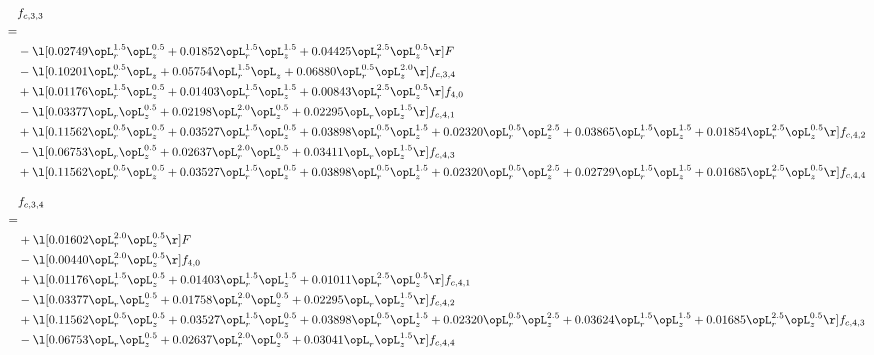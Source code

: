 \begin{alignat}{2} 
\label{eq:f_33_2} 
& f_{c,3,3} \nonumber \\ 
 = \\ 
& - \l[  0.02749 \opL_r^{1.5} \opL_z^{0.5} +  0.01852 \opL_r^{1.5} \opL_z^{1.5} +  0.04425 \opL_r^{2.5} \opL_z^{0.5}  \r] F \nonumber \\ 
& - \l[  0.10201 \opL_r^{0.5} \opL_z +  0.05754 \opL_r^{1.5} \opL_z +  0.06880 \opL_r^{0.5} \opL_z^{2.0}  \r] f_{c,3,4} \nonumber \\ 
& + \l[  0.01176 \opL_r^{1.5} \opL_z^{0.5} +  0.01403 \opL_r^{1.5} \opL_z^{1.5} +  0.00843 \opL_r^{2.5} \opL_z^{0.5}  \r] f_{4,0} \nonumber \\ 
& - \l[  0.03377 \opL_r \opL_z^{0.5} +  0.02198 \opL_r^{2.0} \opL_z^{0.5} +  0.02295 \opL_r \opL_z^{1.5}  \r] f_{c,4,1} \nonumber \\ 
& + \l[  0.11562 \opL_r^{0.5} \opL_z^{0.5} +  0.03527 \opL_r^{1.5} \opL_z^{0.5} +  0.03898 \opL_r^{0.5} \opL_z^{1.5} +  0.02320 \opL_r^{0.5} \opL_z^{2.5} +  0.03865 \opL_r^{1.5} \opL_z^{1.5} +  0.01854 \opL_r^{2.5} \opL_z^{0.5}  \r] f_{c,4,2} \nonumber \\ 
& - \l[  0.06753 \opL_r \opL_z^{0.5} +  0.02637 \opL_r^{2.0} \opL_z^{0.5} +  0.03411 \opL_r \opL_z^{1.5}  \r] f_{c,4,3} \nonumber \\ 
& + \l[  0.11562 \opL_r^{0.5} \opL_z^{0.5} +  0.03527 \opL_r^{1.5} \opL_z^{0.5} +  0.03898 \opL_r^{0.5} \opL_z^{1.5} +  0.02320 \opL_r^{0.5} \opL_z^{2.5} +  0.02729 \opL_r^{1.5} \opL_z^{1.5} +  0.01685 \opL_r^{2.5} \opL_z^{0.5}  \r] f_{c,4,4} \nonumber \\ 
\end{alignat} 


\begin{alignat}{2} 
\label{eq:f_34_2} 
& f_{c,3,4} \nonumber \\ 
 = \\ 
& + \l[  0.01602 \opL_r^{2.0} \opL_z^{0.5}  \r] F \nonumber \\ 
& - \l[  0.00440 \opL_r^{2.0} \opL_z^{0.5}  \r] f_{4,0} \nonumber \\ 
& + \l[  0.01176 \opL_r^{1.5} \opL_z^{0.5} +  0.01403 \opL_r^{1.5} \opL_z^{1.5} +  0.01011 \opL_r^{2.5} \opL_z^{0.5}  \r] f_{c,4,1} \nonumber \\ 
& - \l[  0.03377 \opL_r \opL_z^{0.5} +  0.01758 \opL_r^{2.0} \opL_z^{0.5} +  0.02295 \opL_r \opL_z^{1.5}  \r] f_{c,4,2} \nonumber \\ 
& + \l[  0.11562 \opL_r^{0.5} \opL_z^{0.5} +  0.03527 \opL_r^{1.5} \opL_z^{0.5} +  0.03898 \opL_r^{0.5} \opL_z^{1.5} +  0.02320 \opL_r^{0.5} \opL_z^{2.5} +  0.03624 \opL_r^{1.5} \opL_z^{1.5} +  0.01685 \opL_r^{2.5} \opL_z^{0.5}  \r] f_{c,4,3} \nonumber \\ 
& - \l[  0.06753 \opL_r \opL_z^{0.5} +  0.02637 \opL_r^{2.0} \opL_z^{0.5} +  0.03041 \opL_r \opL_z^{1.5}  \r] f_{c,4,4} \nonumber \\ 
\end{alignat} 


